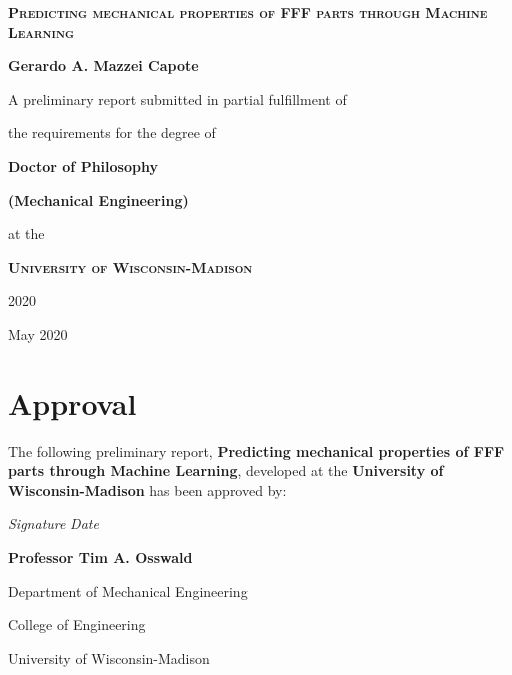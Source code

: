 \documentclass[main.tex]{subfiles}
\begin{document}
\begin{titlepage}
	\begin{center}
		\vspace{1cm}
		{\scshape\Huge\textbf{Predicting mechanical properties of FFF parts through Machine Learning} \par}
		\vspace{1cm}
		{\LARGE\textbf{Gerardo A. Mazzei Capote} \par}
		\vspace{1cm}
		{\Large A preliminary report submitted in partial fulfillment of \par 
				the requirements for the degree of \par}
		\vspace{1cm}
		{\LARGE\textbf{Doctor of Philosophy} \par}
		{\LARGE\textbf{(Mechanical Engineering)} \par}
		\vspace{1cm}
		{\Large at the \par}
		\vspace{0.5cm}
		{\scshape\LARGE\textbf{ University of Wisconsin-Madison} \par}
		\vspace{0.5cm}
		{\Large 2020 \par}
		\vfill
		{\large May 2020}		%
	\end{center}
\end{titlepage}

\pagestyle{empty}
\cleardoublepage
\setcounter{page}{1}

\chapter*{Approval}
The following preliminary report, \textbf{Predicting mechanical properties of FFF parts through Machine Learning}, developed at the \textbf{University of Wisconsin-Madison}
has been approved by:
\vspace{2cm}

\noindent
\makebox[7cm]{\hrulefill} \hfill\makebox[4cm]{\hrulefill}
\par\noindent
\textit{Signature} \hfill\textit{Date}\hspace{3cm}
\vspace{5 mm}
\par\noindent
\textbf{Professor Tim A. Osswald}
\par\noindent Department of Mechanical Engineering
\par\noindent College of Engineering
\par\noindent University of Wisconsin-Madison

\cleardoublepage
\end{document}
